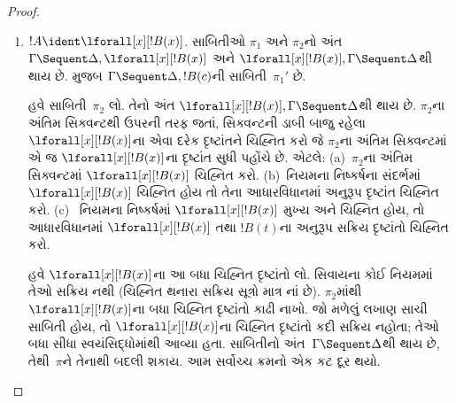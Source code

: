 \begin{proof}
\begin{enumerate}
  લગાવતાં $!C, !B, \Gamma \Sequent \Delta$ની
  સાબિતી~$\pi_2'''$ પણ મળે છે.
  સાબિતી~$\pi'$ આ છે:
  \[
  \AxiomC{}
  \RightLabel{$\pi_2'$}
  \Deduce$\Gamma \fCenter \Delta, !B$
  \AxiomC{}
  \RightLabel{$\pi_1'$}
  \Deduce$!B, \Gamma \fCenter \Delta, !C$
  \AxiomC{}
  \RightLabel{$\pi_2'''$}
  \Deduce$!C, !B, \Gamma \fCenter \Delta$
  \RightLabel{\CutCS}
  \BinaryInf$!B, \Gamma \fCenter \Delta$
  \RightLabel{\CutCS}
  \BinaryInf$\Gamma \fCenter \Delta$
  \DisplayProof
  \]
  \item $!A \ident \lforall[x][!B(x)]$. સાબિતીઓ $\pi_1$ અને
  $\pi_2$નો અંત $\Gamma \Sequent \Delta, \lforall[x][!B(x)]$
  અને $\lforall[x][!B(x)], \Gamma \Sequent \Delta$થી થાય છે.
   મુજબ
  $\Gamma \Sequent \Delta, !B(c)$ની
  સાબિતી~$\pi_1'$ છે.

  હવે સાબિતી~$\pi_2$ લો. તેનો અંત
  $\lforall[x][!B(x)], \Gamma \Sequent \Delta$થી
  થાય છે. $\pi_2$ના અંતિમ સિક્વન્ટથી ઉપરની તરફ
  જતાં, સિક્વન્ટની ડાબી બાજુ રહેલા
  $\lforall[x][!B(x)]$ના એવા દરેક દૃષ્ટાંતને
  ચિહ્નિત કરો જે $\pi_2$ના અંતિમ સિક્વન્ટમાં
  એ જ $\lforall[x][!B(x)]$ના દૃષ્ટાંત સુધી પહોંચે છે. એટલે:
  (a)~$\pi_2$ના અંતિમ સિક્વન્ટમાં
  $\lforall[x][!B(x)]$ ચિહ્નિત કરો.
  (b)~નિયમના નિષ્કર્ષના સંદર્ભમાં
  $\lforall[x][!B(x)]$
  ચિહ્નિત હોય તો તેના આધારવિધાનમાં અનુરૂપ
  દૃષ્ટાંત ચિહ્નિત કરો. (c)~\LeftR{\lforall}
  નિયમના નિષ્કર્ષમાં $\lforall[x][!B(x)]$
  મુખ્ય અને ચિહ્નિત હોય, તો આધારવિધાનમાં
  $\lforall[x][!B(x)]$ તથા $!B(t)$ના
  અનુરૂપ સક્રિય દૃષ્ટાંતો ચિહ્નિત કરો.
  
  હવે $\lforall[x][!B(x)]$ના આ બધા
  ચિહ્નિત દૃષ્ટાંતો લો. \LeftR{\lforall}
  સિવાયના કોઈ નિયમમાં તેઓ સક્રિય નથી
  (ચિહ્નિત થનારા સક્રિય સૂત્રો
  માત્ર \LeftR{\lforall}નાં છે).
  $\pi_2$માંથી $\lforall[x][!B(x)]$ના
  બધા ચિહ્નિત દૃષ્ટાંતો કાઢી નાખો.
  જો મળેલું લખાણ સાચી સાબિતી હોય,
  તો $\lforall[x][!B(x)]$ના ચિહ્નિત
  દૃષ્ટાંતો કદી સક્રિય નહોતા;
  તેઓ બધા સીધા સ્વયંસિદ્ધોમાંથી આવ્યા હતા.
  સાબિતીનો અંત~$\Gamma \Sequent \Delta$થી
  થાય છે, તેથી~$\pi$ને તેનાથી બદલી શકાય.
  આમ સર્વોચ્ચ ક્રમનો એક કટ દૂર થયો.


\end{enumerate}
\end{proof}
